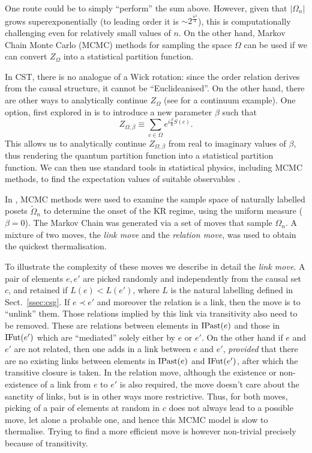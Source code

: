 One route could be to simply ``perform''  the sum above. However, given that $|\Omega_n|$ grows superexponentially (to  leading order it is  $\sim 2^{\frac{n^2}{4}}$), this is computationally challenging even for relatively small values of $n$. On the other hand, Markov Chain Monte Carlo (MCMC)  methods for sampling the space $\Omega$ can be used if we can convert $Z_{\Omega}$ into a statistical partition function.

In CST, there is no analogue of a Wick rotation: since the order relation derives from the causal structure, it cannot
be ``Euclideanised''. On the other hand, there are other ways to analytically  continue $Z_{\Omega}$ (see
\citealt{sorkinlouko} for a continuum example). One option, first explored in \cite{2dqg} is to introduce a new parameter
$\beta$ such that  
\begin{equation} 
Z_{\Omega,\beta} \equiv  \sum_{c \in \Omega} e^{i  \frac{\beta}{\hbar} S(c)}. 
 \end{equation}  
This allows us to analytically continue $Z_{\Omega,\beta}$ from real to imaginary values of $\beta$, thus rendering the
quantum partition function into a statistical partition function. We can then  use  standard tools in statistical
physics, including MCMC methods,  to find the expectation values of suitable observables \citep{2dqg,2dhh,fss,ising}.  


In \cite{onset}, MCMC methods were used to examine the sample space of {naturally labelled} posets $\tilde{\Omega}_n$
to determine the onset of the KR regime, using the uniform measure ($\beta=0$).
The Markov Chain was  generated via a set of moves that sample  $\Omega_n$. A  mixture of two
moves,  the \emph{link move} and the \emph{relation move},  was used to obtain  the quickest thermalisation.

To illustrate the complexity of these  moves we describe in detail the 
\emph{link move}.  A  pair of elements $e,e'$ are picked randomly and independently from the causal set $c$, and retained
if  $L(e) < L(e')$, where $L$ is the natural labelling defined in Sect.~\ref{ssec:csg}. If $e \prec
e'$ and moreover the relation is a  link, then the move is to ``unlink'' them. Those relations implied by this link via
transitivity also need to be removed. These are  relations between elements in $\mathrm{IPast}(e)$  and those in $\mathrm{IFut}(e')$
which are ``mediated'' solely either by $e$ or $e'$. On the other hand if $e$ and $e'$ are not related, then one adds in a
link between $e$ and $e'$, \emph{provided} that there are no existing  links between elements in $ \mathrm{IPast}(e)$ and $\mathrm{IFut}(e')$,
after which the transitive closure is taken.  In the relation move, although the existence or non-existence  of a link from $e$ to
$e'$ is also required, the move doesn't care about the sanctity of links, but is in other ways more restrictive.  Thus,
for both moves, picking of a pair of elements at random in $c$ does not always lead to a possible move, let alone a probable
one, and hence this  MCMC model is slow to thermalise. Trying to find a more efficient move is however non-trivial
precisely because of transitivity. 

